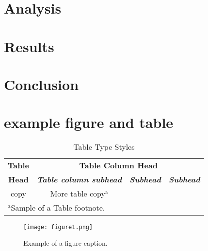 \documentclass[conference,a4paper]{IEEEtran}
\begin{document}
\section{Analysis}\label{sec: four}

\section{Results}\label{sec: five}

\section{Conclusion}\label{sec: six}




\section{example figure and table}
\begin{table}[htbp]
\caption{Table Type Styles}
\begin{center}
\begin{tabular}{|c|c|c|c|}
\hline
\textbf{Table}&\multicolumn{3}{|c|}{\textbf{Table Column Head}} \\
\cline{2-4} 
\textbf{Head} & \textbf{\textit{Table column subhead}}& \textbf{\textit{Subhead}}& \textbf{\textit{Subhead}} \\
\hline
copy& More table copy$^{\mathrm{a}}$& &  \\
\hline
\multicolumn{4}{l}{$^{\mathrm{a}}$Sample of a Table footnote.}
\end{tabular}
\label{tab1}
\end{center}
\end{table}

\begin{figure}[htbp]
\centerline{\texttt{[image: figure1.png]}}
\caption{Example of a figure caption.}
\label{fig}
\end{figure}




\end{document}

